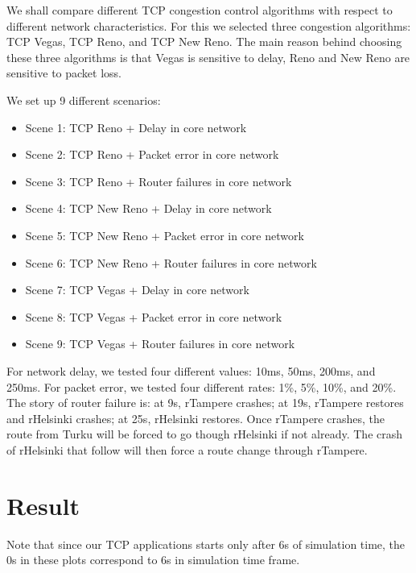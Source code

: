 \documentclass[conference,a4paper]{../../sty/IEEEtran}
\begin{document}
We shall compare different TCP congestion control algorithms with respect to different network characteristics.
For this we selected three congestion algorithms: TCP Vegas, TCP Reno, and TCP New Reno.
The main reason behind choosing these three algorithms is that Vegas is sensitive to delay, Reno and New Reno are sensitive to packet loss.

We set up 9 different scenarios:
\begin{itemize}
\item Scene 1: TCP Reno + Delay in core network
\item Scene 2: TCP Reno + Packet error in core network
\item Scene 3: TCP Reno + Router failures in core network
\item Scene 4: TCP New Reno + Delay in core network
\item Scene 5: TCP New Reno + Packet error in core network
\item Scene 6: TCP New Reno + Router failures in core network
\item Scene 7: TCP Vegas + Delay in core network
\item Scene 8: TCP Vegas + Packet error in core network
\item Scene 9: TCP Vegas + Router failures in core network
\end{itemize}

For network delay, we tested four different values: 10ms, 50ms, 200ms, and 250ms.
For packet error, we tested four different rates: 1\%, 5\%, 10\%, and 20\%.
The story of router failure is: at 9s, rTampere crashes; at 19s, rTampere restores and rHelsinki crashes; at 25s, rHelsinki restores.
Once rTampere crashes, the route from Turku will be forced to go though rHelsinki if not already.
The crash of rHelsinki that follow will then force a route change through rTampere.


\section{Result}

Note that since our TCP applications starts only after 6s of simulation time, the 0s in these plots correspond to 6s in simulation time frame.

\end{document}
